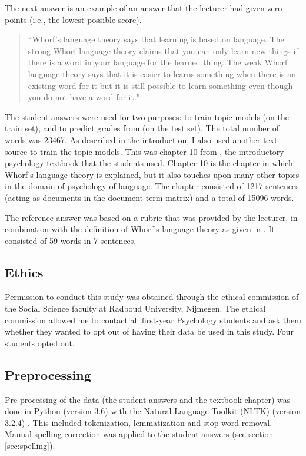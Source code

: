 \documentclass[a4paper,10pt,twoside]{article}
\begin{document}
The next answer is an example of an answer that the lecturer had given zero points (i.e., the lowest possible score).

\begin{quote}
	``Whorf's language theory says that learning is based on language. The strong Whorf language theory claims that you can only learn new things if there is a word in your language for the learned thing. The weak Whorf language theory says that it is easier to learns something when there is an existing word for it but it is still possible to learn something even though you do not have a word for it."
\end{quote}

The student answers were used for two purposes: to train topic models (on the train set), and to predict grades from (on the test set). The total number of words was 23467. As described in the introduction, I also used another text source to train the topic models. This was chapter 10 from , the introductory psychology textbook that the students used. Chapter 10 is the chapter in which Whorf's language theory is explained, but it also touches upon many other topics in the domain of psychology of language. The chapter consisted of 1217 sentences (acting as documents in the document-term matrix) and a total of 15096 words.

The reference answer was based on a rubric that was provided by the lecturer, in combination with the definition of Whorf's language theory as given in . It consisted of 59 words in 7 sentences.

\subsection{Ethics}
Permission to conduct this study was obtained through the ethical commission of the Social Science faculty at Radboud University, Nijmegen. The ethical commission allowed me to contact all first-year Psychology students and ask them whether they wanted to opt out of having their data be used in this study. Four students opted out. 

\subsection{Preprocessing}
Pre-processing of the data (the student answers and the textbook chapter) was done in Python (version 3.6) with the Natural Language Toolkit (NLTK) (version 3.2.4) \cite{bird2009}. This included tokenization, lemmatization and stop word removal. Manual spelling correction was applied to the student answers (see section \ref{sec:spelling}).
\end{document}
